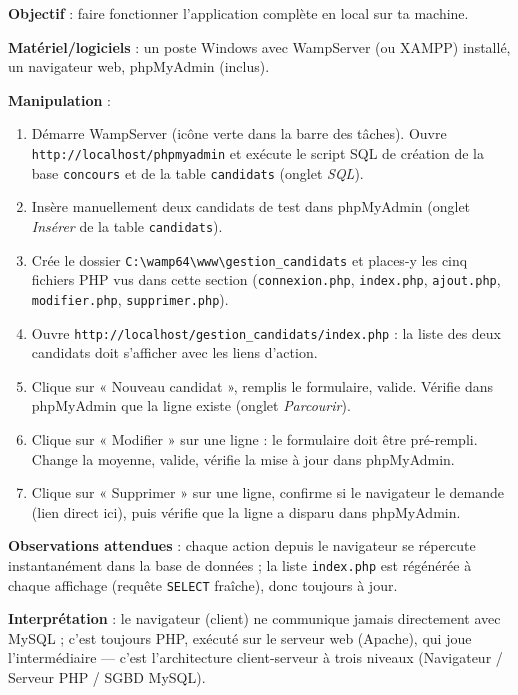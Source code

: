 \documentclass[11pt]{article}
\begin{document}
\begin{experience}
\textbf{Objectif} : faire fonctionner l'application complète en local sur ta machine.

\textbf{Matériel/logiciels} : un poste Windows avec WampServer (ou XAMPP) installé, un navigateur web, phpMyAdmin (inclus).

\textbf{Manipulation} :
\begin{enumerate}
\item Démarre WampServer (icône verte dans la barre des tâches). Ouvre \texttt{http://localhost/phpmyadmin} et exécute le script SQL de création de la base \texttt{concours} et de la table \texttt{candidats} (onglet \emph{SQL}).
\item Insère manuellement deux candidats de test dans phpMyAdmin (onglet \emph{Insérer} de la table \texttt{candidats}).
\item Crée le dossier \texttt{C:\textbackslash wamp64\textbackslash www\textbackslash gestion\_candidats} et places-y les cinq fichiers PHP vus dans cette section (\texttt{connexion.php}, \texttt{index.php}, \texttt{ajout.php}, \texttt{modifier.php}, \texttt{supprimer.php}).
\item Ouvre \texttt{http://localhost/gestion\_candidats/index.php} : la liste des deux candidats doit s'afficher avec les liens d'action.
\item Clique sur « Nouveau candidat », remplis le formulaire, valide. Vérifie dans phpMyAdmin que la ligne existe (onglet \emph{Parcourir}).
\item Clique sur « Modifier » sur une ligne : le formulaire doit être pré-rempli. Change la moyenne, valide, vérifie la mise à jour dans phpMyAdmin.
\item Clique sur « Supprimer » sur une ligne, confirme si le navigateur le demande (lien direct ici), puis vérifie que la ligne a disparu dans phpMyAdmin.
\end{enumerate}

\textbf{Observations attendues} : chaque action depuis le navigateur se répercute instantanément dans la base de données ; la liste \texttt{index.php} est régénérée à chaque affichage (requête \texttt{SELECT} fraîche), donc toujours à jour.

\textbf{Interprétation} : le navigateur (client) ne communique jamais directement avec MySQL ; c'est toujours PHP, exécuté sur le serveur web (Apache), qui joue l'intermédiaire — c'est l'architecture client-serveur à trois niveaux (Navigateur / Serveur PHP / SGBD MySQL).
\end{experience}
\end{document}
